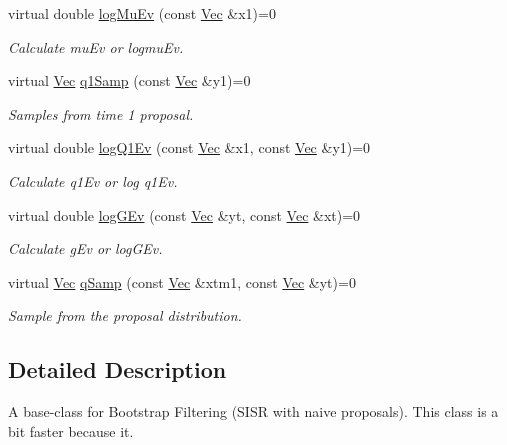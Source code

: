 \begin{DoxyCompactItemize}
virtual double \hyperlink{classBSFilter_a1c1084627bfaf2f3ccf882fc23240b7a}{log\+Mu\+Ev} (const \hyperlink{apf__filter_8h_a4c7df05c6f5e8a0d15ae14bcdbc07152}{Vec} \&x1)=0
\begin{DoxyCompactList}\small\item\em Calculate mu\+Ev or logmu\+Ev. \end{DoxyCompactList}\item 
virtual \hyperlink{apf__filter_8h_a4c7df05c6f5e8a0d15ae14bcdbc07152}{Vec} \hyperlink{classBSFilter_a9792df8f9b13495bc8bdcc53adeae347}{q1\+Samp} (const \hyperlink{apf__filter_8h_a4c7df05c6f5e8a0d15ae14bcdbc07152}{Vec} \&y1)=0
\begin{DoxyCompactList}\small\item\em Samples from time 1 proposal. \end{DoxyCompactList}\item 
virtual double \hyperlink{classBSFilter_a4d2bc2a2530306abaf1a717596b5814d}{log\+Q1\+Ev} (const \hyperlink{apf__filter_8h_a4c7df05c6f5e8a0d15ae14bcdbc07152}{Vec} \&x1, const \hyperlink{apf__filter_8h_a4c7df05c6f5e8a0d15ae14bcdbc07152}{Vec} \&y1)=0
\begin{DoxyCompactList}\small\item\em Calculate q1\+Ev or log q1\+Ev. \end{DoxyCompactList}\item 
virtual double \hyperlink{classBSFilter_aa612efc58f9442a7f6401a5edf0c2799}{log\+G\+Ev} (const \hyperlink{apf__filter_8h_a4c7df05c6f5e8a0d15ae14bcdbc07152}{Vec} \&yt, const \hyperlink{apf__filter_8h_a4c7df05c6f5e8a0d15ae14bcdbc07152}{Vec} \&xt)=0
\begin{DoxyCompactList}\small\item\em Calculate g\+Ev or log\+G\+Ev. \end{DoxyCompactList}\item 
virtual \hyperlink{apf__filter_8h_a4c7df05c6f5e8a0d15ae14bcdbc07152}{Vec} \hyperlink{classBSFilter_ac23ed2dc31035a7b1f5e1ce21ac66869}{q\+Samp} (const \hyperlink{apf__filter_8h_a4c7df05c6f5e8a0d15ae14bcdbc07152}{Vec} \&xtm1, const \hyperlink{apf__filter_8h_a4c7df05c6f5e8a0d15ae14bcdbc07152}{Vec} \&yt)=0
\begin{DoxyCompactList}\small\item\em Sample from the proposal distribution. \end{DoxyCompactList}\end{DoxyCompactItemize}


\subsection{Detailed Description}
A base-\/class for Bootstrap Filtering (S\+I\+SR with naive proposals). This class is a bit faster because it. 

